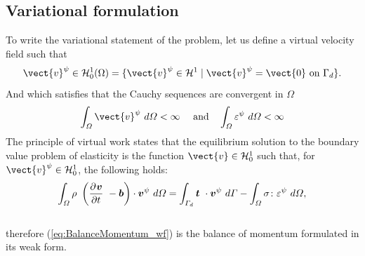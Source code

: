 \subsection{Variational formulation}
\label{sec:variational-formulation}
To write the variational statement of the problem, let us define a
virtual velocity field such that
\begin{equation}
  \label{eq:Hilbert-space}
  \vect{v}^{\psi} \in \mathcal{H}^1_0(\Omega) = \{ \vect{v}^{\psi} \in
  \mathcal{H}^1 \mid \vect{v}^{\psi} = \vect{0}\ \text{on}\ \Gamma_d \}.
\end{equation}
And which satisfies that the Cauchy sequences are convergent in $\varOmega$
\begin{equation}
  \label{eq:cauchy-secuence}
  \Integral{3}{\vect{v}^{\psi}} < \infty\ \quad\text{and}\quad \Integral{3}{\tens{\varepsilon}^{\psi}} < \infty
\end{equation}
The principle of virtual work states that the equilibrium solution to
the boundary value problem of elasticity is the function $\vect{v} \in
\mathcal{H}^1_0$ such that, for $\vect{v}^{\psi} \in
\mathcal{H}^1_0$, the following holds:
\begin{equation}
  \label{eq:BalanceMomentum_wf}
  \Integral{3}{\rho\ \left( \Deriv{\vec{v}}{t}\ - \vec{b} \right) \cdot \vec{v}^{\psi}} =
  \Integral{2}{\vec{t}\ \cdot \vec{v}^{\psi}} - \Integral{3}{\tens{\sigma} \colon
    \tens{\varepsilon}^{\psi}},
\end{equation}\\
therefore (\ref{eq:BalanceMomentum_wf}) is the balance of momentum formulated in
its weak form.

